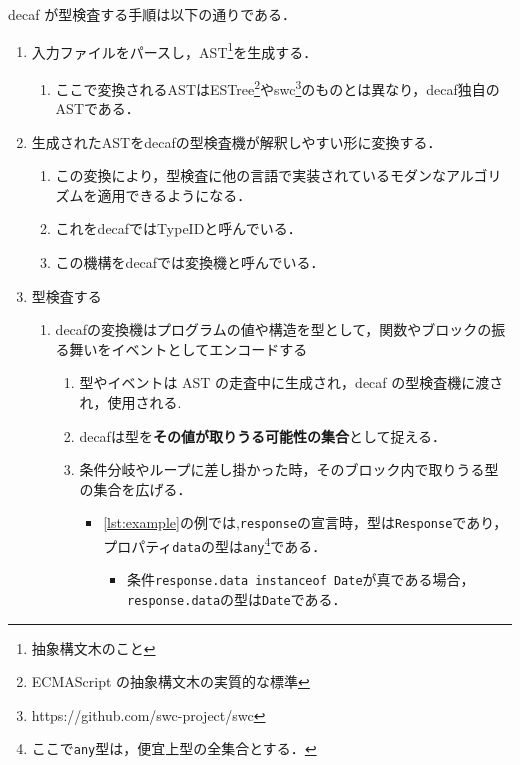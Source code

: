 decaf が型検査する手順は以下の通りである．

\begin{enumerate}
    \item 入力ファイルをパースし，AST\footnote{抽象構文木のこと}を生成する．
          \begin{enumerate}
              \item ここで変換されるASTはESTree\footnote{ECMAScript の抽象構文木の実質的な標準}やswc\footnote{https://github.com/swc-project/swc}のものとは異なり，decaf独自のASTである．
          \end{enumerate}
    \item 生成されたASTをdecafの型検査機が解釈しやすい形に変換する．
          \begin{enumerate}
              \item この変換により，型検査に他の言語で実装されているモダンなアルゴリズムを適用できるようになる．
              \item これをdecafではTypeIDと呼んでいる．
              \item この機構をdecafでは変換機と呼んでいる．
          \end{enumerate}
    \item 型検査する
          \begin{enumerate}
              \item decafの変換機はプログラムの値や構造を型として，関数やブロックの振る舞いをイベントとしてエンコードする
                    \begin{enumerate}
                        \item 型やイベントは AST の走査中に生成され，decaf の型検査機に渡され，使用される.
                        \item decafは型を\textbf{その値が取りうる可能性の集合}として捉える．
                        \item 条件分岐やループに差し掛かった時，そのブロック内で取りうる型の集合を広げる．
                              \begin{itemize}
                                  \item \ref{lst:example}の例では,\texttt{response}の宣言時，型は\texttt{Response}であり，プロパティ\texttt{data}の型は\texttt{any}\footnote{ここで\texttt{any}型は，便宜上型の全集合とする．}である．
                                        \begin{itemize}
                                            \item 条件\texttt{response.data instanceof Date}が真である場合，\texttt{response.data}の型は\texttt{Date}である．

\end{itemize}
\end{itemize}
\end{enumerate}
\end{enumerate}
\end{enumerate}
